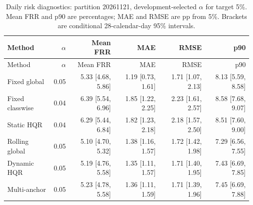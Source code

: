 \begingroup\small\setlength{\tabcolsep}{3pt}
\begin{longtable}{lrrrrr}
\caption{Daily risk diagnostics: partition 20261121, development-selected $\alpha$ for target 5\%. Mean FRR and p90 are percentages; MAE and RMSE are pp from 5\%. Brackets are conditional 28-calendar-day 95\% intervals.}\label{tab:final-risk-0-1}\\
\toprule
Method & $\alpha$ & Mean FRR & MAE & RMSE & p90\\
\midrule
\endfirsthead
\toprule
Method & $\alpha$ & Mean FRR & MAE & RMSE & p90\\
\midrule
\endhead
Fixed global & 0.05 & 5.33 [4.68, 5.86] & 1.19 [0.73, 1.61] & 1.71 [1.07, 2.13] & 8.13 [5.59, 8.58]\\
Fixed classwise & 0.04 & 6.39 [5.54, 6.96] & 1.85 [1.22, 2.25] & 2.23 [1.61, 2.57] & 8.58 [7.68, 9.07]\\
Static HQR & 0.04 & 6.29 [5.44, 6.84] & 1.82 [1.23, 2.18] & 2.18 [1.57, 2.50] & 8.51 [7.60, 9.00]\\
Rolling global & 0.05 & 5.10 [4.70, 5.32] & 1.38 [1.16, 1.57] & 1.72 [1.42, 1.98] & 7.29 [6.56, 7.55]\\
Dynamic HQR & 0.05 & 5.19 [4.76, 5.58] & 1.35 [1.11, 1.57] & 1.71 [1.40, 1.95] & 7.43 [6.69, 7.85]\\
Multi-anchor & 0.05 & 5.23 [4.78, 5.58] & 1.36 [1.11, 1.59] & 1.71 [1.39, 1.96] & 7.45 [6.69, 7.88]\\
\bottomrule
\end{longtable}
\endgroup
